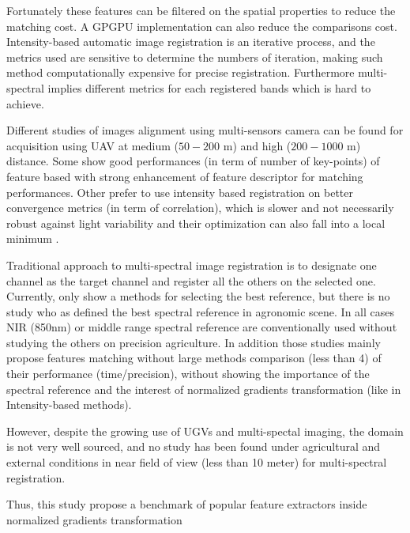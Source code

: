 \documentclass[]{elsarticle}
\begin{document}
	Fortunately these features can be filtered on the spatial properties to reduce the matching cost. A GPGPU implementation can also reduce the comparisons cost.
	Intensity-based automatic image registration is an iterative process, and the metrics used are sensitive to determine the numbers of iteration,
	making such method computationally expensive for precise registration. Furthermore multi-spectral implies different metrics for each registered bands which is hard to achieve.
	\\
	\par Different studies of images alignment using multi-sensors camera can be found for acquisition using UAV at medium ($50-200$ m) and high ($200-1000$ m) distance.
	Some show good performances (in term of number of key-points) of feature based \cite{DantasDiasJunior, Vakalopoulou} with strong enhancement of feature descriptor for matching performances.
	Other prefer to use intensity based registration \cite{douarre:hal-02183837} on better convergence metrics \cite{8118101} (in term of correlation),
	which is slower and not necessarily robust against light variability and their optimization can also fall into a local minimum \cite{Vioix2004ConceptionER}.
	\\
	\par Traditional approach to multi-spectral image registration is to designate one channel as the target channel and register all the others on the selected one.
	Currently, only \cite{DantasDiasJunior} show a methods for selecting the best reference,
	but there is no study who as defined the best spectral reference in agronomic scene.
	In all cases NIR (850nm) or middle range spectral reference are conventionally used without studying the others on precision agriculture.
	In addition those studies mainly propose features matching without large methods comparison \cite{DantasDiasJunior}(less than 4) of their performance (time/precision),
	without showing the importance of the spectral reference and the interest of normalized gradients transformation (like in Intensity-based methods).
	\\
	\par However, despite the growing use of UGVs and multi-spectal imaging, the domain is not very well sourced,
	and no study has been found under agricultural and external conditions in near field of view (less than 10 meter) for multi-spectral registration.
	\\
	\par Thus, this study propose a benchmark of popular feature extractors inside normalized gradients transformation
\end{document}
